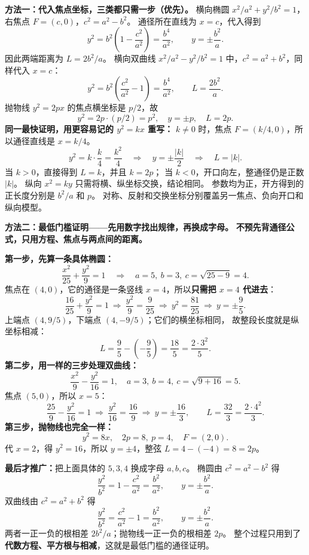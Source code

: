 \begin{proofbox}
\textbf{方法一：代入焦点坐标，三类都只需一步（优先）。}
横向椭圆 $x^2/a^2+y^2/b^2=1$，右焦点 $F=(c,0)$，$c^2=a^2-b^2$。
通径所在直线为 $x=c$，代入得到
\[
 y^2=b^2\left(1-\frac{c^2}{a^2}\right)=\frac{b^4}{a^2},
 \qquad y=\pm\frac{b^2}{a}.
\]
因此两端距离为 $L=2b^2/a$。
横向双曲线 $x^2/a^2-y^2/b^2=1$ 中，$c^2=a^2+b^2$，同样代入 $x=c$：
\[
 y^2=b^2\left(\frac{c^2}{a^2}-1\right)=\frac{b^4}{a^2},
 \qquad L=\frac{2b^2}{a}.
\]
抛物线 $y^2=2px$ 的焦点横坐标是 $p/2$，故
\[
 y^2=2p\cdot(p/2)=p^2,\quad y=\pm p,\quad L=2p.
\]
\textbf{同一最快证明，用更容易记的 $y^2=kx$ 重写：}
$k\ne0$ 时，焦点 $F=(k/4,0)$，所以通径直线是 $x=k/4$。
\[
 y^2=k\cdot\frac{k}{4}=\frac{k^2}{4}
 \quad\Longrightarrow\quad y=\pm\frac{|k|}{2}
 \quad\Longrightarrow\quad \boxed{L=|k|}.
\]
当 $k>0$，直接得到 $L=k$，并且 $k=2p$；
当 $k<0$，开口向左，整通径仍是正数 $|k|$。
纵向 $x^2=ky$ 只需将横、纵坐标交换，结论相同。
参数均为正，开方得到的正长度分别是 $b^2/a$ 和 $p$。
对称、反射和交换坐标分别覆盖另一焦点、负向开口和纵向模型。
\end{proofbox}
\clearpage
\begin{proofbox}
\textbf{方法二：最低门槛证明——先用数字找出规律，再换成字母。}
\textbf{不预先背通径公式，只用方程、焦点与两点间的距离。}

\textbf{第一步，先算一条具体椭圆：}
\[
 \frac{x^2}{25}+\frac{y^2}{9}=1
 \quad\Rightarrow\quad a=5,\ b=3,\ c=\sqrt{25-9}=4.
\]
焦点在 $(4,0)$，它的通径是一条竖线 $x=4$，所以\textbf{只需把 $x=4$ 代进去}：
\[
 \frac{16}{25}+\frac{y^2}{9}=1
 \ \Rightarrow\ \frac{y^2}{9}=\frac{9}{25}
 \ \Rightarrow\ y^2=\frac{81}{25}
 \ \Rightarrow\ y=\pm\frac95.
\]
上端点 $(4,9/5)$，下端点 $(4,-9/5)$；它们的横坐标相同，
故整段长度就是纵坐标相减：
\[
 L=\frac95-\left(-\frac95\right)=\frac{18}{5}
 =\frac{2\cdot3^2}{5}.
\]
\textbf{第二步，用一样的三步处理双曲线：}
\[
 \frac{x^2}{9}-\frac{y^2}{16}=1,
 \quad a=3,\ b=4,\ c=\sqrt{9+16}=5.
\]
焦点 $(5,0)$，所以 $x=5$：
\[
 \frac{25}{9}-\frac{y^2}{16}=1
 \ \Rightarrow\ \frac{y^2}{16}=\frac{16}{9}
 \ \Rightarrow\ y=\pm\frac{16}{3},
 \qquad L=\frac{32}{3}=\frac{2\cdot4^2}{3}.
\]
\textbf{第三步，抛物线也完全一样：}
\[
 y^2=8x,\quad 2p=8,\ p=4,\quad F=(2,0).
\]
代 $x=2$，得 $y^2=16$，所以 $y=\pm4$，整弦 $L=4-(-4)=8=2p$。

\medskip
\textbf{最后才推广：}把上面具体的 $5,3,4$ 换成字母 $a,b,c$。
椭圆由 $c^2=a^2-b^2$ 得
\[
 \frac{y^2}{b^2}=1-\frac{c^2}{a^2}
 =\frac{b^2}{a^2},\qquad y=\pm\frac{b^2}{a}.
\]
双曲线由 $c^2=a^2+b^2$ 得
\[
 \frac{y^2}{b^2}=\frac{c^2}{a^2}-1
 =\frac{b^2}{a^2},\qquad y=\pm\frac{b^2}{a}.
\]
两者一正一负的根相差 $2b^2/a$；抛物线一正一负的根相差 $2p$。
整个过程只用到了\textbf{代数方程、平方根与相减}，这就是最低门槛的通径证明。
\end{proofbox}
